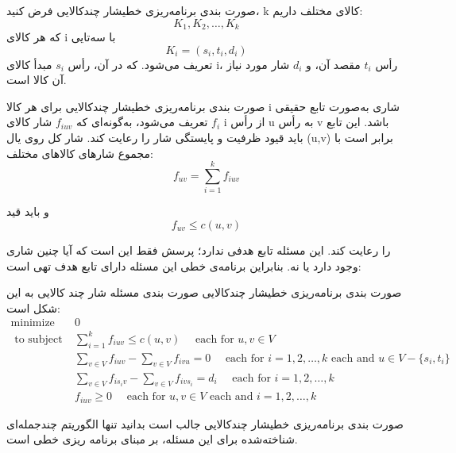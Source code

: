 \begin{itemframe-s}{صورت بندی برنامه‌ریزی خطی}{شار چندکالایی}
\itm
فرض کنید، k کالای مختلف داریم:
$$
K_1, K_2, \dots, K_k
$$
که هر کالای i با سه‌تایی
$$
K_i = (s_i, t_i, d_i)
$$
تعریف می‌شود. که در آن، رأس $s_i$ مبدأ کالای i، رأس $ t_i$ مقصد آن، و $d_i$ شار مورد نیاز آن کالا است.

\end{itemframe-s}


\begin{itemframe-s}{صورت بندی برنامه‌ریزی خطی}{شار چندکالایی}
\itm
برای هر کالا i شاری به‌صورت تابع حقیقی $f_i$ تعریف می‌شود، به‌گونه‌ای که $f_{iuv}$ شار کالای i از رأس u به رأس v باشد.
این تابع باید قیود ظرفیت و پایستگی شار را رعایت کند. شار کل
 روی یال (u,v) برابر است با مجموع شار‌های کالاهای مختلف:
$$
f_{uv} = \sum_{i=1}^k f_{iuv}
$$

و باید قید
$$
f_{uv} \leq c(u,v)
$$

را رعایت کند.
\itm
این مسئله تابع هدفی ندارد؛ پرسش فقط این است که آیا چنین شاری وجود دارد یا نه. بنابراین برنامه‌ی خطی این مسئله دارای تابع هدف تهی
 است:
\end{itemframe-s}


\begin{itemframe-s}{صورت بندی برنامه‌ریزی خطی}{شار چندکالایی}
\itm
 صورت بندی مسئله شار چند کالایی به این شکل است:
\begin{align*}
\text{minimize} \quad
& 0 \\[3pt]
\text{ to subject} \quad
& \sum_{i=1}^k f_{iuv} \leq c(u,v)
   \quad \text{ each for }u,v \in V \\[3pt]
& \sum_{v \in V} f_{iuv} - \sum_{v \in V} f_{ivu} = 0
   \quad \text{ each for } i = 1,2,\dots,k  \text{ each and }
   u \in V - \{s_i,t_i\} \\[3pt]
& \sum_{v \in V} f_{is_iv} - \sum_{v \in V} f_{iv s_i} = d_i
   \quad \text{ each for } i = 1,2,\dots,k \\[3pt]
& f_{iuv} \geq 0
   \quad \text{ each for } u,v \in V \text{ each and }
   i = 1,2,\dots,k
\end{align*}

\end{itemframe-s}


\begin{itemframe-s}{صورت بندی برنامه‌ریزی خطی}{شار چندکالایی}
\itm
جالب است بدانید تنها الگوریتم چندجمله‌ای شناخته‌شده برای این مسئله، بر مبنای برنامه‌ ریزی خطی است.

\end{itemframe-s}